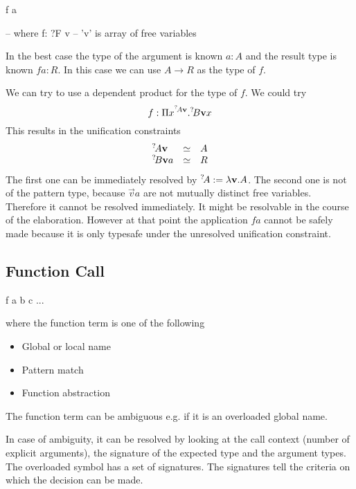 \begin{alba}
    f a

    -- where
    f: ?F v     -- 'v' is array of free variables
\end{alba}

In the best case the type of the argument is known $a: A$ and the result type is
known $f a: R$. In this case we can use $A \to R$ as the type of $f$.

We can try to use a dependent product for the type of $f$. We could try
$$
    f: \Pi x^{\meta{A} \vec{v}}. \meta{B} \vec{v}x
$$
%
This results in the unification constraints
$$
\begin{array}{lll}
    \meta{A} \vec{v}
    &\unify&
    A

    \\

    \meta{B} \vec{v} a
    &\unify&
    R
\end{array}
$$
%
The first one can be immediately resolved by $\meta{A} := \lambda \vec{v}. A$.
The second one is not of the pattern type, because $\vec{v} a$ are not mutually
distinct free variables. Therefore it cannot be resolved immediately. It might
be resolvable in the course of the elaboration. However at that point the
application $f a$ cannot be safely made because it is only typesafe under the
unresolved unification constraint.




\vskip 5mm
\subsection{Function Call}


\begin{alba}
    f a b c ...
\end{alba}
where the function term  is one of the following

\begin{itemize}
\item
    Global or local name
\item
    Pattern match
\item
    Function abstraction
\end{itemize}

The function term can be ambiguous e.g. if it is an overloaded global name.

In case of ambiguity, it can be resolved by looking at the call context (number
of explicit arguments), the signature of the expected type and the argument
types. The overloaded symbol has a set of signatures. The signatures tell the
criteria on which the decision can be made.

